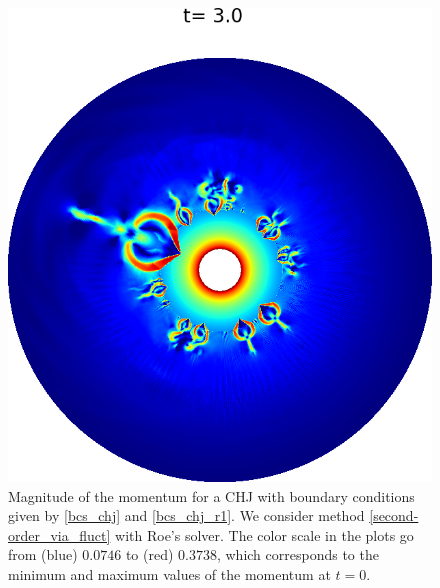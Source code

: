 \documentclass[preprint, 11pt]{article}
\begin{document}
\begin{figure}[!h]
  \includegraphics[scale=0.28]{figures/chj_r1_roe_p3.png} \quad
  \caption{Magnitude of the momentum for a CHJ with boundary conditions given by
    \eqref{bcs_chj} and \eqref{bcs_chj_r1}. 
    We consider method \eqref{second-order_via_fluct} with Roe's solver.    
    The color scale in the plots go from (blue) $0.0746$ to (red) $0.3738$,
    which corresponds to the minimum and maximum values of the momentum at $t=0$.
    \label{fig:chj_r1}}
\end{figure}
\end{document}
